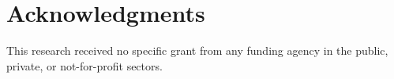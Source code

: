 \documentclass[10pt,a4paper]{article}
\begin{document}
\section*{Acknowledgments}

    This research received no specific grant from any funding agency in the public, private,  or
    not-for-profit sectors.





\end{document}
